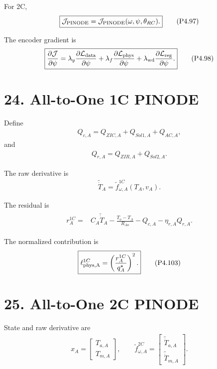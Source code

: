 \documentclass[11pt]{article}
\begin{document}
For 2C,
\begin{align}
\boxed{
\mathcal J_{\rm PINODE}
=
\mathcal J_{\rm PINODE}(\omega,\psi,\theta_{RC}).
}
\tag{P4.97}
\end{align}

The encoder gradient is
\begin{align}
\boxed{
\frac{\partial\mathcal J}{\partial\psi}
=
\lambda_y
\frac{\partial\mathcal L_{\rm data}}{\partial\psi}
+
\lambda_f
\frac{\partial\mathcal L_{\rm phys}}{\partial\psi}
+
\lambda_{\rm wd}
\frac{\partial\mathcal L_{\rm reg}}{\partial\psi}.
}
\tag{P4.98}
\end{align}

\section*{24. All-to-One 1C PINODE}

Define
\begin{align}
\boxed{
Q_{c,A}
=
Q_{ZIC,A}+Q_{Sol1,A}+Q_{AC,A},
}
\tag{P4.99}
\end{align}
and
\begin{align}
\boxed{
Q_{r,A}
=
Q_{ZIR,A}+Q_{Sol2,A}.
}
\tag{P4.100}
\end{align}

The raw derivative is
\begin{align}
\boxed{
\widetilde{\dot T}_A
=
\widetilde f_{\omega,A}^{1C}(T_A,v_A).
}
\tag{P4.101}
\end{align}

The residual is
\begin{align}
\boxed{
\begin{aligned}
r_A^{1C}
={}&
C_A\widetilde{\dot T}_A
-
\frac{T_o-T_A}{R_{Ao}}
-
Q_{c,A}
-
\eta_{r,A}Q_{r,A}.
\end{aligned}
}
\tag{P4.102}
\end{align}

The normalized contribution is
\begin{align}
\boxed{
\ell_{\rm phys,A}^{1C}
=
\left(\frac{r_A^{1C}}{q_A^\star}\right)^2.
}
\tag{P4.103}
\end{align}

\section*{25. All-to-One 2C PINODE}

State and raw derivative are
\begin{align}
\boxed{
x_A=
\begin{bmatrix}
T_{a,A}\\T_{m,A}
\end{bmatrix},
\qquad
\widetilde f_{\omega,A}^{2C}
=
\begin{bmatrix}
\widetilde{\dot T}_{a,A}\\
\widetilde{\dot T}_{m,A}
\end{bmatrix}.
}
\tag{P4.104}
\end{align}
\end{document}
